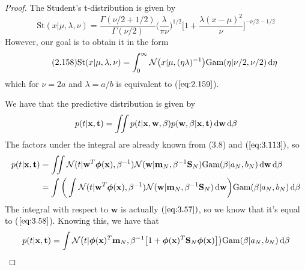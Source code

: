 \begin{proof}
    The Student's t-distribution is given by
    \begin{equation}\label{eq:2.159}\tag{2.159}
        \text{St}(x | \mu, \lambda, \nu)
        = \frac{\Gamma(\nu/2 + 1/2)}{\Gamma(\nu/2)} \bigg(\frac{\lambda}{\pi \nu}\bigg)^{1/2}
        \bigg[1 + \frac{\lambda(x - \mu)^2}{\nu}\bigg]^{-\nu/2 - 1/2}
    \end{equation}
    However, our goal is to obtain it in the form
    \begin{equation}\label{eq:2.158}\tag{2.158}
        \text{St}(x | \mu, \lambda, \nu)
        = \int_{0}^{\infty} \mathcal{N}\big(x | \mu, (\eta\lambda)^{-1}\big)
        \text{Gam}(\eta | \nu/2, \nu/2) \mathop{}\!\mathrm{d} \eta
    \end{equation}
    which for $\nu = 2a$ and $\lambda = a/b$ is equivalent to ($\ref{eq:2.159}$). 

    We have that the predictive distribution is given by
    \[
        p(t | \mathbf{x}, \mathbf{t}) 
        = \iint p(t | \mathbf{x}, \mathbf{w}, \beta) p(\mathbf{w}, \beta | \mathbf{x}, \mathbf{t})
        \mathop{}\!\mathrm{d} \mathbf{w} \mathop{}\!\mathrm{d} \beta
    \] 
    The factors under the integral are already known from (3.8) and 
    $(\ref{eq:3.113})$, so
    \begin{align*}
        p(t | \mathbf{x}, \mathbf{t}) 
        &= \iint \mathcal{N}(t | \mathbf{w}^T\bm{\phi}(\mathbf{x}), \beta^{-1}) 
            \mathcal{N}(\mathbf{w} | \mathbf{m}_N, \beta^{-1} \mathbf{S}_N) 
            \text{Gam}(\beta | a_N, b_N)
            \mathop{}\!\mathrm{d} \mathbf{w} \mathop{}\!\mathrm{d} \beta \\
        &= \int \bigg(\int \mathcal{N}(t | \mathbf{w}^T\bm{\phi}(\mathbf{x}), \beta^{-1}) 
            \mathcal{N}(\mathbf{w} | \mathbf{m}_N, \beta^{-1} \mathbf{S}_N) 
            \mathop{}\!\mathrm{d} \mathbf{w}\bigg)
            \text{Gam}(\beta | a_N, b_N)
            \mathop{}\!\mathrm{d} \beta
    \end{align*}
    The integral with respect to $\mathbf{w}$ is actually $(\ref{eq:3.57})$, so
    we know that it's equal to ($\ref{eq:3.58}$). Knowing this, we have that
    \[
        p(t | \mathbf{x}, \mathbf{t}) 
        = \int \mathcal{N}\big(t | \bm{\phi}(\mathbf{x})^T\mathbf{m}_N, 
        \beta^{-1} \big[1 + \bm{\phi}(\mathbf{x})^T\mathbf{S}_N\bm{\phi}(\mathbf{x})\big]\big)
        \text{Gam}(\beta | a_N, b_N) \mathop{}\!\mathrm{d} \beta
    \] 
\end{proof}

